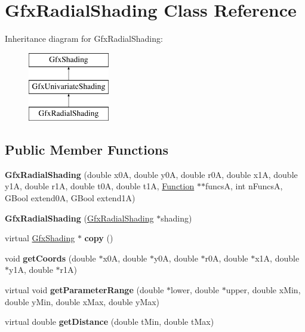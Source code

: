 \hypertarget{class_gfx_radial_shading}{}\section{Gfx\+Radial\+Shading Class Reference}
\label{class_gfx_radial_shading}
Inheritance diagram for Gfx\+Radial\+Shading\+:\begin{figure}[H]
\begin{center}
\leavevmode
\includegraphics[height=3.000000cm]{class_gfx_radial_shading}
\end{center}
\end{figure}
\subsection*{Public Member Functions}
\begin{DoxyCompactItemize}
\item 
\mbox{\label{class_gfx_radial_shading_a5aff3485a66eb0d5b3175145d6dcf91c}} 
{\bfseries Gfx\+Radial\+Shading} (double x0A, double y0A, double r0A, double x1A, double y1A, double r1A, double t0A, double t1A, \hyperlink{class_function}{Function} $\ast$$\ast$funcsA, int n\+FuncsA, G\+Bool extend0A, G\+Bool extend1A)
\item 
\mbox{\label{class_gfx_radial_shading_a5b02c80ce651087e4dc48a07e83b8df6}} 
{\bfseries Gfx\+Radial\+Shading} (\hyperlink{class_gfx_radial_shading}{Gfx\+Radial\+Shading} $\ast$shading)
\item 
\mbox{\label{class_gfx_radial_shading_a696d0aef9e92b1f906dbc7366972ddfc}} 
virtual \hyperlink{class_gfx_shading}{Gfx\+Shading} $\ast$ {\bfseries copy} ()
\item 
\mbox{\label{class_gfx_radial_shading_a4f98c8d83d3606b1c2e0c272456add1b}} 
void {\bfseries get\+Coords} (double $\ast$x0A, double $\ast$y0A, double $\ast$r0A, double $\ast$x1A, double $\ast$y1A, double $\ast$r1A)
\item 
\mbox{\label{class_gfx_radial_shading_a84a233eddd2548601f5dc6868898e667}} 
virtual void {\bfseries get\+Parameter\+Range} (double $\ast$lower, double $\ast$upper, double x\+Min, double y\+Min, double x\+Max, double y\+Max)
\item 
\mbox{\label{class_gfx_radial_shading_ac4452558bfae50a539e6ce3bd41abbef}} 
virtual double {\bfseries get\+Distance} (double t\+Min, double t\+Max)
\end{DoxyCompactItemize}
